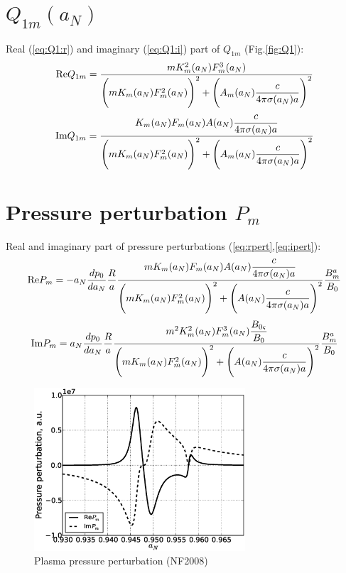 \documentclass[11pt,oneside,a4paper,notitlepage]{article}
\begin{document}
\section{$Q_{1m}(a_N)$}
Real (\ref{eq:Q1:r}) and imaginary (\ref{eq:Q1:i}) part of $Q_{1m}$ (Fig.\ref{fig:Q1}):
\begin{equation}\label{eq:Q1:r}
 \textnormal{Re}Q_{1m}=\frac{mK_m^2(a_N)F_m^3(a_N)}{\\
 \Bigg(mK_m(a_N)F_m^2(a_N)\Bigg)^2+\Bigg(A_m(a_N)\dfrac{c}{4\pi\sigma(a_N)a}\Bigg)^2}
\end{equation}
\begin{equation}\label{eq:Q1:i}
 \textnormal{Im}Q_{1m}=\frac{K_m(a_N)F_m(a_N)A(a_N)\dfrac{c}{4\pi\sigma(a_N) a}}{\\
 \Bigg(mK_m(a_N)F_m^2(a_N)\Bigg)^2+\Bigg(A_m(a_N)\dfrac{c}{4\pi\sigma(a_N)a}\Bigg)^2}
\end{equation}
\section{Pressure perturbation $P_m$}
Real and imaginary part of pressure perturbations (\ref{eq:rpert},\ref{eq:ipert}):
\begin{equation} \label{eq:rpert}
 \textnormal{Re}P_m=-a_N\frac{dp_0}{da_N}\frac{R}{a} \\
 \frac{mK_m(a_N)F_m(a_N)A(a_N)\dfrac{c}{4\pi\sigma(a_N)a}}{\Bigg( \\
 mK_m(a_N)F_m^2(a_N) \Bigg)^2 + \Bigg( \\
 A(a_N) \dfrac{c}{4\pi\sigma(a_N)a} \Bigg)^2}\\
 \frac{B_m^a}{B_0}
\end{equation}
\begin{equation} \label{eq:ipert}
 \textnormal{Im}P_m=a_N\frac{dp_0}{da_N}\frac{R}{a} \\
 \frac{m^2K_m^2(a_N)F_m^3(a_N)\dfrac{B_{0\varsigma}}{B_0}}{\Bigg( \\
 mK_m(a_N)F_m^2(a_N) \Bigg)^2 + \Bigg( \\
 A(a_N) \dfrac{c}{4\pi\sigma(a_N)a} \Bigg)^2}\frac{B_m^a}{B_0}
\end{equation}
\begin{figure}
 \centering
 \includegraphics[width=0.7\textwidth]{perturbation.eps}
 \caption{Plasma pressure perturbation (NF2008)}
 \label{fig:pert}
\end{figure}
\end{document}
